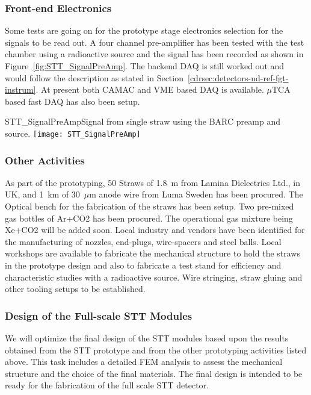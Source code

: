 \subsubsection{Front-end Electronics} 

Some tests are going on for the prototype stage electronics selection
for the signals to be read out.  A four channel pre-amplifier has been
tested with the test chamber using a radioactive source and the signal
has been recorded as shown in Figure~\ref{fig:STT_SignalPreAmp}.  The
backend DAQ is still worked out and would follow the description as
stated in Section~\ref{cdrsec:detectors-nd-ref-fgt-instrum}. At
present both CAMAC and VME based DAQ is available. $\mu$TCA based fast
DAQ has also been setup.
\begin{cdrfigure}  
{STT_SignalPreAmp}{Signal from single straw using the BARC preamp and source.}  
\texttt{[image: STT\_SignalPreAmp]}
\end{cdrfigure}


\subsubsection{Other Activities}

As part of the prototyping, 50 Straws of 1.8~m from Lamina
Dielectrics Ltd., in UK, and 1~km of 30~$\mu$m anode wire from Luma
Sweden has been procured. The Optical bench for the fabrication of the
straws has been setup.  Two pre-mixed gas bottles of Ar+CO2 has been
procured. The operational gas mixture being Xe+CO2 will be added
soon. Local industry and vendors have been identified for the
manufacturing of nozzles, end-plugs, wire-spacers and steel
balls. Local workshops are available to fabricate the mechanical
structure to hold the straws in the prototype design and also to
fabricate a test stand for efficiency and characteristic studies with
a radioactive source. Wire stringing, straw gluing and other tooling
setups to be established.


\subsubsection{Design of the Full-scale STT Modules} 
 
We will optimize the final design of the STT modules based upon the
results obtained from the STT prototype and from the other prototyping
activities listed above. This task includes a detailed FEM analysis to
assess the mechanical structure and the choice of the final
materials. The final design is intended to be ready for the
fabrication of the full scale STT detector.



